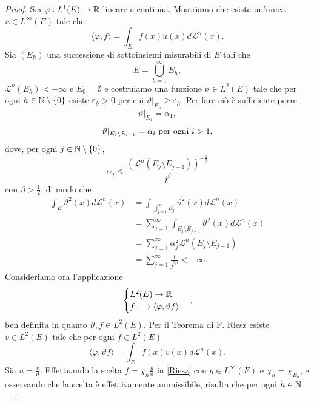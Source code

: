 \begin{proof}
	Sia $\varphi : L^{1}(E) \to \mathbb{R}$ lineare e continua. Mostriamo che esiste un'unica $u \in L^{\infty}(E)$ tale che 
	\[ \langle \varphi, f \rangle = \int_{E}f(x)u(x)d\mathcal{L}^{n}(x). \]
	Sia $(E_{h})$ una successione di sottoinsiemi misurabili di $E$ tali che 
	\[ E = \bigcup_{h=1}^{\infty} E_{h}, \]
	$\mathcal{L}^{n}(E_{h}) < +\infty$ e $E_{0} = \emptyset$ e costruiamo una funzione $\vartheta \in L^{2}(E)$ tale che per ogni $h \in \mathbb{N}\setminus\left\lbrace 0 \right\rbrace $ esiste $\varepsilon_{h} > 0$ per cui $\vartheta|_{E_{h}} \ge \varepsilon_{h}$. Per fare ciò è sufficiente porre
	\[ \vartheta|_{E_{1}} = \alpha_{1}, \]
	\[ \vartheta|_{E_{i}\setminus E_{i-1}} = \alpha_{i} \textup{ per ogni } i >1,\]
	dove, per ogni $j \in \mathbb{N}\setminus\left\lbrace 0 \right\rbrace$,
	\[ \alpha_{j} \le \dfrac{\left( \mathcal{L}^{n}\left( E_{j}\setminus E_{j-1}\right)\right) ^{-\frac{1}{2}}}{j^{\beta}} \]
	con $\beta > \frac{1}{2}$, di modo che 
	\begin{equation*}
		\begin{split}
			\int_{E} \vartheta^{2}(x)d\mathcal{L}^{n}(x)&=  \int_{\bigcup_{j=1}^{\infty} E_{j}} \vartheta^{2}(x)d\mathcal{L}^{n}(x) \\ 
			&=\sum_{j = 1}^{\infty}\int_{E_{j}\setminus E_{j-1}} \vartheta^{2}(x)d\mathcal{L}^{n}(x) \\
			&=  \sum_{j = 1}^{\infty} \alpha^{2}_{j} \mathcal{L}^{n}\left( E_{j}\setminus E_{j-1}\right) \\
			&= \sum_{j=1}^\infty \frac{1}{j^{2\beta}} < +\infty.
		\end{split}
	\end{equation*}
	Consideriamo ora l'applicazione 
	\[ \begin{cases}
		L^{2}(E) \to \mathbb{R} \\
		f \longmapsto \langle \varphi, \vartheta f \rangle
	\end{cases}, \]
	ben definita in quanto $\vartheta, f \in L^{2}(E)$. Per il Teorema di F. Riesz esiste $v \in L^{2}(E)$ tale che per ogni $f \in L^{2}(E)$
	\begin{equation}\label{Riesz}
		\langle \varphi,\vartheta f \rangle = \int_{E}f(x)v(x)d\mathcal{L}^{n}(x).
	\end{equation}
	Sia $u = \frac{v}{\vartheta}$. Effettuando la scelta $f = \chi_{h}\frac{g}{\vartheta}$ in \eqref{Riesz} con $g \in L^{\infty}(E)$ e $\chi_{h} = \chi_{E_{h}}$, e osservando che la scelta è effettivamente ammissibile, risulta che per ogni $h \in \mathbb{N}$
	\begin{equation}\label{condizioneimportante}

\end{equation}
\end{proof}
